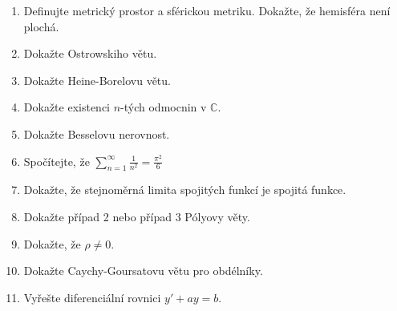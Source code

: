 \documentclass[11pt]{article}
\theoremstyle{nontheoremstyle}
\theoremstyle{nontheoremstylenodot}
\theoremstyle{theoremstyle}
\begin{document}
\begin{enumerate}
    \item {
        Definujte metrický prostor a sférickou metriku. Dokažte, že hemisféra není plochá.
    }
    \item {
        Dokažte Ostrowskiho větu.
    }
    \item {
        Dokažte Heine-Borelovu větu.
    }
    \item {
        Dokažte existenci $n$-tých odmocnin v $\mathbb{C}$.
    }
    \item {
        Dokažte Besselovu nerovnost.
    }
    \item {
        Spočítejte, že $ \sum_{n=1}^{\infty} \frac{1}{n^2} = \frac{\pi^2}{6} $
    }
    \item {
        Dokažte, že stejnoměrná limita spojitých funkcí je spojitá funkce.
    }
    \item {
        Dokažte případ 2 nebo případ 3 Pólyovy věty.
    }
    \item {
        Dokažte, že $\rho \neq 0$.
    }
    \item {
        Dokažte Caychy-Goursatovu větu pro obdélníky.
    }
    \item {
        Vyřešte diferenciální rovnici $y' + ay = b$.
    }
\end{enumerate}
\end{document}

